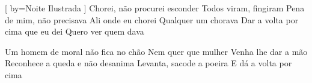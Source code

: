 [
    by={Noite Ilustrada}
]
\beginverse*
Chorei, não procurei esconder
Todos viram, fingiram
Pena de mim, não precisava
Ali onde eu chorei
Qualquer um chorava
Dar a volta por cima que eu dei
Quero ver quem dava
\endverse

\beginverse*
Um homem de moral não fica no chão
Nem quer que mulher
Venha lhe dar a mão
Reconhece a queda e não desanima
Levanta, sacode a poeira
E dá a volta por cima
\endverse

\endsong

